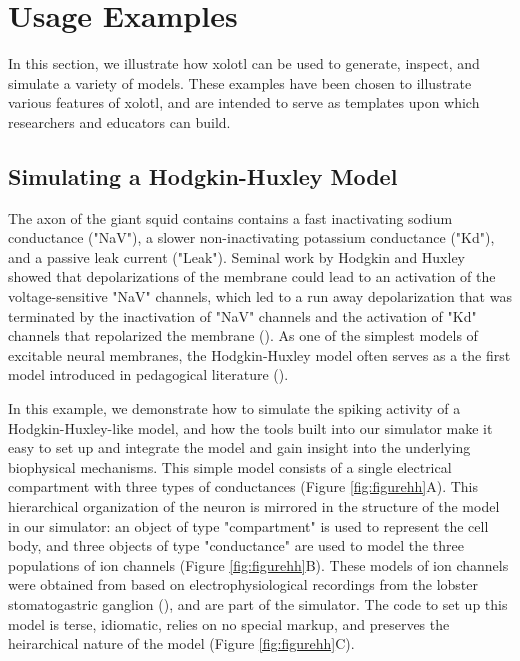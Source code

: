 \documentclass{frontiersSCNS} %
\begin{document}
%
%
%
%
%
%

\section{Usage Examples}
\label{usage}

In this section, we illustrate how xolotl can be used to generate, inspect, and simulate a variety of models. These examples have been chosen to illustrate various features of xolotl, and are intended to serve as templates upon which researchers and educators can build.

%
%
%
%
%
%

\subsection{Simulating a Hodgkin-Huxley Model}

The axon of the giant squid contains contains a fast inactivating sodium conductance ("NaV"), a slower non-inactivating potassium conductance ("Kd"), and a passive leak current ("Leak"). Seminal work by Hodgkin and Huxley showed that depolarizations of the membrane could lead to an activation of the voltage-sensitive "NaV" channels, which led to a run away depolarization that was terminated by the inactivation of "NaV" channels and the activation of "Kd" channels that repolarized the membrane (\cite{hodgkinComponentsMembraneConductance1952, hodgkinMeasurementCurrentvoltageRelations1952}). As one of the simplest models of excitable neural membranes, the Hodgkin-Huxley model often serves as a the first model introduced in pedagogical literature (\cite{dayanTheoreticalNeuroscience2001, sterrattPrinciplesComputationalModelling2011, trappenbergFundamentalsComputationalNeuroscience2010}).


In this example, we demonstrate how to simulate the spiking activity of a Hodgkin-Huxley-like model, and how the tools built into our simulator make it easy to set up and integrate the model and gain insight into the underlying biophysical mechanisms. This simple model consists of a single electrical compartment with three types of conductances (Figure \ref{fig:figurehh}A). This hierarchical organization of the neuron is mirrored in the structure of the model in our simulator: an object of type "compartment" is used to represent the cell body, and three objects of type "conductance" are used to model the three populations of ion channels (Figure \ref{fig:figurehh}B). These models of ion channels were obtained from \cite{liuModelNeuronActivityDependent1998} based on electrophysiological recordings from the lobster stomatogastric ganglion (\cite{turrigianoSelectiveRegulationCurrent1995}), and are part of the simulator. The code to set up this model is terse, idiomatic, relies on no special markup, and preserves the heirarchical nature of the model (Figure \ref{fig:figurehh}C).
\end{document}
